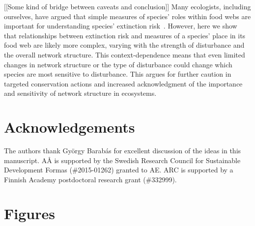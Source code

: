 \documentclass[12pt]{article}
\begin{document}
\begin{spacing}{2.0}
    
    
    [[Some kind of bridge between caveats and conclusion]]
    Many ecologists, including ourselves, have argued that simple measures of species' roles within food webs are important for understanding species' extinction risk~\citep{}. 
    However, here we show that relationships between extinction risk and measures of a species' place in its food web are likely more complex, varying with the strength of disturbance and the overall network structure.
    This context-dependence means that even limited changes in network structure or the type of disturbance could change which species are most sensitive to disturbance. 
    This argues for further caution in targeted conservation actions and increased acknowledgment of the importance and sensitivity of network structure in ecosystems. 
    
\section*{Acknowledgements}

    The authors thank Gy\"{o}rgy Barab\'{a}s for excellent discussion of the ideas in this manuscript. A{\AA} is supported by the Swedish Research Council for Sustainable Development Formas (\#2015-01262) granted to AE. ARC is supported by a Finnish Academy postdoctoral research grant (\#332999).

\clearpage    

\section*{Figures}
    


\end{spacing}
\end{document}
